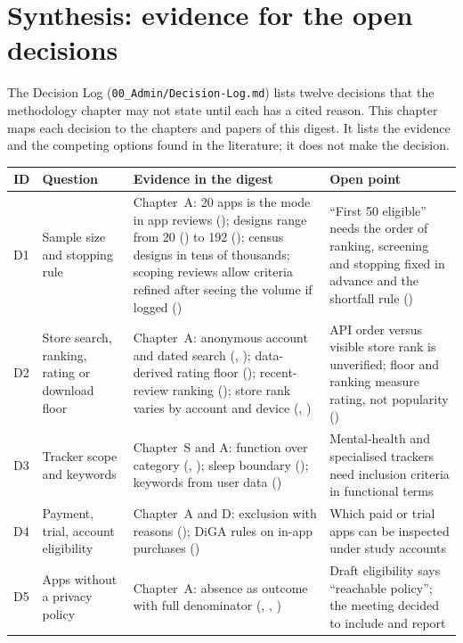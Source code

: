 \chapter{Synthesis: evidence for the open decisions}

\noindent The Decision Log (\texttt{00\_Admin/Decision-Log.md}) lists twelve decisions that the methodology chapter may not state until each has a cited reason. This chapter maps each decision to the chapters and papers of this digest. It lists the evidence and the competing options found in the literature; it does not make the decision.

\begin{longtable}{@{}P{0.9cm}P{3.2cm}P{4.5cm}P{4.9cm}@{}}
\toprule
\textbf{ID} & \textbf{Question} & \textbf{Evidence in the digest} & \textbf{Open point}\\
\midrule
\endhead
D1 & Sample size and stopping rule & Chapter~A: 20 apps is the mode in app reviews (); designs range from 20 () to 192 (); census designs in tens of thousands; scoping reviews allow criteria refined after seeing the volume if logged () & ``First 50 eligible'' needs the order of ranking, screening and stopping fixed in advance and the shortfall rule ()\\
D2 & Store search, ranking, rating or download floor & Chapter~A: anonymous account and dated search (, ); data-derived rating floor (); recent-review ranking (); store rank varies by account and device (, ) & API order versus visible store rank is unverified; floor and ranking measure rating, not popularity ()\\
D3 & Tracker scope and keywords & Chapter~S and A: function over category (, ); sleep boundary (); keywords from user data () & Mental-health and specialised trackers need inclusion criteria in functional terms\\
D4 & Payment, trial, account eligibility & Chapter~A and D: exclusion with reasons (); DiGA rules on in-app purchases () & Which paid or trial apps can be inspected under study accounts\\
D5 & Apps without a privacy policy & Chapter~A: absence as outcome with full denominator (, , ) & Draft eligibility says ``reachable policy''; the meeting decided to include and report\\

\end{longtable}
